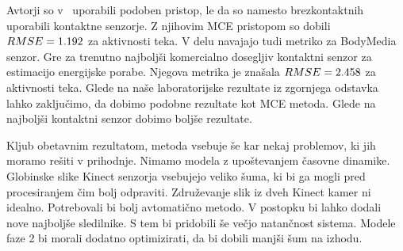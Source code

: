 Avtorji so v~\cite{gjoreski2015context} uporabili podoben pristop, le da so namesto brezkontaktnih uporabili kontaktne senzorje. Z njihovim MCE pristopom so dobili ${RMSE}=1.192$ za aktivnosti teka. V delu navajajo tudi metriko za BodyMedia senzor. Gre za trenutno najboljši komercialno dosegljiv kontaktni senzor za estimacijo energijske porabe. Njegova metrika je znašala ${RMSE}=2.458$ za aktivnosti teka. Glede na naše laboratorijske rezultate iz zgornjega odstavka lahko zaključimo, da dobimo podobne rezultate kot MCE metoda. Glede na najboljši kontaktni senzor dobimo boljše rezultate.

Kljub obetavnim rezultatom, metoda vsebuje še kar nekaj problemov, ki jih moramo rešiti v prihodnje. Nimamo modela z upoštevanjem časovne dinamike. Globinske slike Kinect senzorja vsebujejo veliko šuma, ki bi ga mogli pred procesiranjem čim bolj odpraviti. Združevanje slik iz dveh Kinect kamer ni idealno. Potrebovali bi bolj avtomatično metodo. V postopku bi lahko dodali nove najboljše sledilnike. S tem bi pridobili še večjo natančnost sistema. Modele faze 2 bi morali dodatno optimizirati, da bi dobili manjši šum na izhodu.